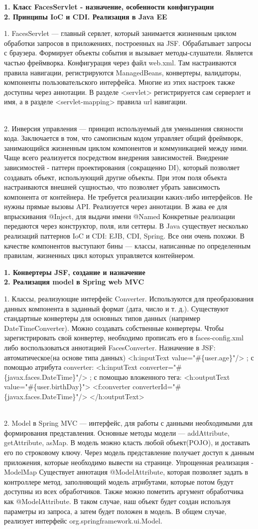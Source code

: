\documentclass{article}
\newcommand{\bil}[4]{%
    \begin{minipage}{.3\textwidth}
        \textbf{1. #1} \\
        \textbf{2. #2}

        1. #3
        \\
        2. #4
    \end{minipage}
}
\begin{document}
\bil{Класс FacesServlet - назначение, особенности конфигурации}{Принципы IoC и CDI. Реализация в Java EE}{
    FacesServlet — главный сервлет, который занимается жизненным циклом обработки запросов в приложениях, построенных на JSF. Обрабатывает запросы с браузера.
    Формирует объекты события и вызывает методы-слушатели. Является частью фреймворка. Конфигурация через файл web.xml.
    Там настраиваются правила навигации, регистрируются ManagedBeans, конвертеры, валидаторы, компоненты пользовательского интерфейса. 
    Многие из этих настроек также доступны через аннотации.
    В разделе <servlet> регистрируется сам серверлет и имя, а в разделе <servlet-mapping> правила url навигации.
}{
    Инверсия управления — принцип используемый для уменьшения связности кода. Заключается в том, что самописным кодом управляет общий фреймворк, занимающийся жизненным циклом компонентов и коммуникацией между ними. Чаще всего реализуется посредством внедрения зависимостей.
    Внедрение зависимостей - паттерн проектирования (сокращенно DI), который позволяет создавать объект, использующий другие объекты. При этом поля объекта настраиваются внешней сущностью, что позволяет убрать зависимость компонента от контейнера.
    Не требуется реализации каких-либо интерфейсов. Не нужны прямые вызовы API. 
    Реализуется через аннотации. В жава ее для впрыскивания @Inject, для выдачи имени @Named
    Конкретные реализации передаются через конструктор, поля, или сеттеры.
    В Java существует несколько реализаций паттернов IoC и CDI: EJB, CDI, Spring. Все они очень похожи. В качестве компонентов выступают бины — классы, написанные по определенным правилам, жизненных цикл которых управляется контейнером.
}
\hfill
\bil{Конвертеры JSF, создание и назначение}{Реализация model в Spring web MVC}{
    Классы, реализующие интерфейс Converter. 
    Используются для преобразования данных компонента в заданный формат (дата, число и т. д.).
    Существуют стандартные конвертеры для основных типов данных (например DateTimeConverter).
    Можно создавать собственные конвертеры.
    Чтобы зарегистрировать свой конвертер, необходимо прописать его в faces-config.xml либо воспользоваться аннотацией FacesConverter.
    Назначение в JSF: автоматическое(на основе типа данных) 
    <h:inputText value="\#\{user.age\}"/>
    ; с помощью атрибута converter:
<h:inputText converter="\#\{javax.faces.DateTime\}"/>
    ; с помощью вложенного тега:
    <h:outputText value="\#\{user.birthDay\}"> <f:converter
converterId="\#\{javax.faces.DateTime\}"/> </h:outputText>
}{
    Model в Spring MVC — интерфейс, для работы с данными необходимыми для формирования представления. 
    Основные методы модели — addAttribute, getAttribute, asMap. В модель можно класть любой объект(POJO), и доставать его по строковому ключу. 
    Через модель представление получает доступ к данным приложения, которые необходимо вывести на странице.
Упрощенная реализация - ModelMap
    Существует аннотация @ModelAttribute, которая позволяет задать в контроллере метод, заполняющий модель атрибутами, которые потом будут доступны из всех обработчиков. 
    Также можно пометить аргумент обработчика как @ModelAttribute. В таком случае, наш объект будет создан используя параметры из запроса, а затем будет положен в модель.
    В общем случае, реализует интерфейс org.springframework.ui.Model.

}
\end{document}
